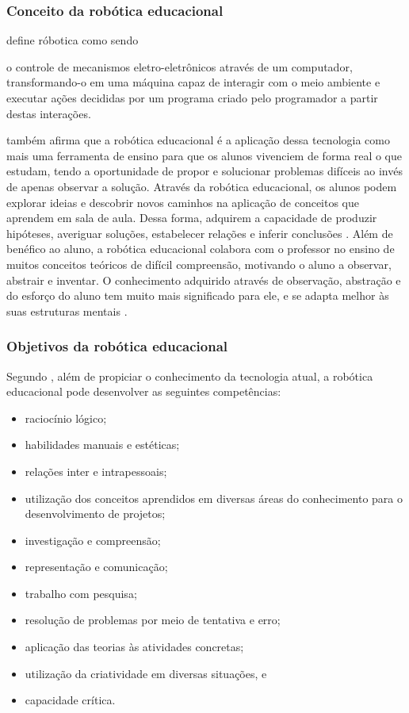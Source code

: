 \subsubsection{Conceito da robótica educacional}
\cite{maisonnette2002utilizaccao} define róbotica como sendo
\begin{citacao}
o controle de mecanismos eletro-eletrônicos através de um computador, 
transformando-o em uma máquina capaz de interagir com o meio ambiente e executar 
ações decididas por um programa criado pelo programador a partir destas interações. 
\end{citacao}
\cite{maisonnette2002utilizaccao} também afirma que a robótica educacional é a aplicação dessa tecnologia como mais uma ferramenta de ensino para que os alunos vivenciem de forma real o que estudam, tendo a oportunidade de propor e solucionar problemas difíceis ao invés de apenas observar a solução.
Através da robótica educacional, os alunos podem explorar ideias e descobrir novos caminhos na aplicação de conceitos que aprendem em sala de aula. Dessa forma, adquirem a capacidade de produzir hipóteses, averiguar soluções, estabelecer relações e inferir conclusões \cite{benitti2009experimentaccao}.
Além de benéfico ao aluno, a robótica educacional colabora com o professor no ensino de muitos conceitos teóricos de difícil compreensão, motivando o aluno a observar, abstrair e inventar. O conhecimento adquirido através de observação, abstração e do esforço do aluno tem muito mais significado para ele, e se adapta melhor às suas estruturas mentais \cite{zilli2004robotica}.

\subsubsection{Objetivos da robótica educacional}
Segundo \cite{zilli2004robotica}, além de propiciar o conhecimento da tecnologia atual, a robótica educacional pode desenvolver as seguintes competências:
\begin{itemize}
\item raciocínio lógico;
\item habilidades manuais e estéticas;
\item relações inter e intrapessoais;
\item utilização dos conceitos aprendidos em diversas áreas do conhecimento para o desenvolvimento de projetos;
\item investigação e compreensão;
\item representação e comunicação;
\item trabalho com pesquisa;
\item resolução de problemas por meio de tentativa e erro;
\item aplicação das teorias às atividades concretas;
\item utilização da criatividade em diversas situações, e
\item capacidade crítica.
\end{itemize}

